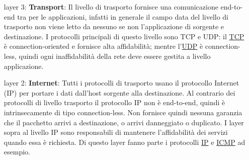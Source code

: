 \begin{enumerate}

    \item[layer 3:] \textbf{Transport}: Il livello di trasporto fornisce una comunicazione end-to-end tra per le applicazioni, infatti in generale il campo data del livello di trasporto non viene letto da nessuno se non l'applicazione di sorgente e destinazione. I protocolli principali di questo livello sono TCP e UDP: il \href{https://en.wikipedia.org/wiki/Transmission_Control_Protocol}{TCP} è connection-oriented e fornisce alta affidabilità; mentre l'\href{https://en.wikipedia.org/wiki/User_Datagram_Protocol}{UDP} è connection-less, quindi ogni inaffidabilità della rete deve essere gestita a livello applicazione.

    \item[layer 2:] \textbf{Internet}: Tutti i protocolli di trasporto usano il protocollo Internet (IP) per portare i dati dall'host sorgente alla destinazione. Al contrario dei protocolli di livello trasporto il protocollo IP non è end-to-end, quindi è intrinsecamente di tipo connection-less. Non fornisce quindi nessuna garanzia che il pacchetto arrivi a destinazione, o arrivi danneggiato o duplicato. I layer sopra al livello IP sono responsabili di mantenere l'affidabilità dei servizi quando essa è richiesta. Di questo layer fanno parte i protocolli \href{https://en.wikipedia.org/wiki/Internet_Protocol}{IP} e \href{https://en.wikipedia.org/wiki/Internet_Control_Message_Protocol}{ICMP} ad esempio.


\end{enumerate}
